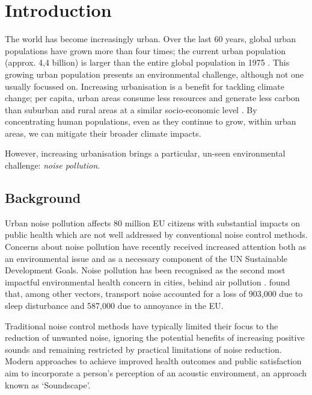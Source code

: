 \chapter{Introduction}
\label{ch:intro}


The world has become increasingly urban. Over the last 60 years, global urban populations have grown more than four times; the current urban population (approx. 4,4 billion) is larger than the entire global population in 1975 . This growing urban population presents an environmental challenge, although not one usually focussed on. Increasing urbanisation is a benefit for tackling climate change; per capita, urban areas consume less resources and generate less carbon than suburban and rural areas at a similar socio-economic level . By concentrating human populations, even as they continue to grow, within urban areas, we can mitigate their broader climate impacts. 

However, increasing urbanisation brings a particular, un-seen environmental challenge: \emph{noise pollution}. 

\section{Background}

Urban noise pollution affects 80 million EU citizens with substantial impacts on public health which are not well addressed by conventional noise control methods. Concerns about noise pollution have recently received increased attention both as an environmental issue \citep{Aletta2022Frontiers} and as a necessary component of the UN Sustainable Development Goals. Noise pollution has been recognised as the second most impactful environmental health concern in cities, behind air pollution \citep{CDC2011Burden}. \citet{CDC2011Burden} found that, among other vectors, transport noise accounted for a loss of 903,000  due to sleep disturbance and 587,000  due to annoyance in the EU.

Traditional noise control methods have typically limited their focus to the reduction of unwanted noise, ignoring the potential benefits of increasing positive sounds and remaining restricted by practical limitations of noise reduction. Modern approaches to achieve improved health outcomes and public satisfaction aim to incorporate a person's perception of an acoustic environment, an approach known as `Soundscape'.

